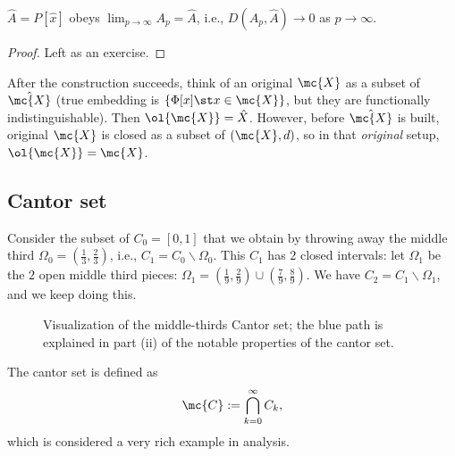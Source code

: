 \begin{claim}
	\(\hat{A}=P[\hat{x}]\) obeys \(\displaystyle\lim_{p\to\infty}A_p=\hat{A}\), i.e., \(D(A_p,\hat{A})\to 0\) as \(p\to\infty\).
\end{claim}
\begin{proof}
	Left as an exercise.
\end{proof}
\begin{note}
	After the construction succeeds, think of an original \(\mc{X}\) as a subset of \(\hat{\mc{X}}\) (true embedding is \(\{\Phi[x]\st x\in\mc{X}\}\), but they are functionally indistinguishable). Then \(\ol{\mc{X}}=\hat{X}\). However, before \(\hat{\mc{X}}\) is built, original \(\mc{X}\) is closed as a subset of \((\mc{X},d)\), so in that \emph{original} setup, \(\ol{\mc{X}}=\mc{X}\).
\end{note}

\subsection{Cantor set}
Consider the subset of \(C_0=[0,1]\) that we obtain by throwing away the middle third \(\Omega_0=\left(\displaystyle\frac{1}{3},\frac{2}{3}\right)\), i.e., \(C_1=C_0\backslash\Omega_0\). This \(C_1\) has \(2\) closed intervals: let \(\Omega_1\) be the \(2\) open middle third pieces: \(\Omega_1=\left(\displaystyle\frac{1}{9},\frac{2}{9}\right)\cup\left(\displaystyle\frac{7}{9},\frac{8}{9}\right)\). We have \(C_2=C_1\backslash\Omega_1\), and we keep doing this.
\begin{figure}[H]
	\centering
	\caption{Visualization of the middle-thirds Cantor set; the blue path is explained in part (ii) of the notable properties of the cantor set.}
\end{figure}
The cantor set is defined as 
\begin{equation*}
	\mc{C}:=\bigcap_{k=0}^{\infty}C_k,
\end{equation*}
which is considered a very rich example in analysis.


